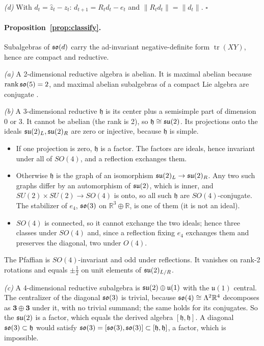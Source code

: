 \emph{(d)} With $d_t=\hat z_t-z_t$: $d_{t+1}=R_td_t-e_t$ and $\|R_td_t\|=\|d_t\|$.
$\square$

\paragraph{Proposition~\ref{prop:classify}.}
Subalgebras of $\mathfrak{so}(d)$ carry the ad-invariant negative-definite form $\operatorname{tr}(XY)$, hence are compact and
reductive.

\emph{(a)} A 2-dimensional reductive algebra is abelian. It is maximal abelian because
$\operatorname{rank}\mathfrak{so}(5)=2$, and maximal abelian subalgebras of a compact Lie algebra are conjugate
\citep{adams1969lectures}.

\emph{(b)} A 3-dimensional reductive $\mathfrak h$ is its center plus a semisimple part of dimension $0$ or $3$.
It cannot be abelian (the rank is 2), so $\mathfrak h\cong\mathfrak{su}(2)$. Its projections onto the ideals $\mathfrak{su}(2)_{L},\mathfrak{su}(2)_{R}$ are zero or injective, because
$\mathfrak h$ is simple.
\begin{itemize}
\item If one projection is zero, $\mathfrak h$ is a factor. The factors are ideals, hence invariant under all of
$SO(4)$, and a reflection exchanges them.
\item Otherwise $\mathfrak h$ is the graph of an isomorphism $\mathfrak{su}(2)_L\to\mathfrak{su}(2)_R$. Any two such graphs differ
by an automorphism of $\mathfrak{su}(2)$, which is inner, and $SU(2)\times SU(2)\to SO(4)$ is onto, so all such $\mathfrak h$
are $SO(4)$-conjugate. The stabilizer of $e_4$, $\mathfrak{so}(3)$ on $\mathbb R^3\oplus\mathbb R$, is one of them (it is not
an ideal).
\item $SO(4)$ is connected, so it cannot exchange the two ideals; hence three classes under $SO(4)$ and, since a
reflection fixing $e_4$ exchanges them and preserves the diagonal, two under $O(4)$.
\end{itemize}
The Pfaffian is $SO(4)$-invariant and odd under reflections. It vanishes on rank-2 rotations and equals
$\pm\frac12$ on unit elements of $\mathfrak{su}(2)_{L/R}$.

\emph{(c)} A 4-dimensional reductive subalgebra is $\mathfrak{su}(2)\oplus\mathfrak u(1)$ with the $\mathfrak u(1)$ central.
The centralizer of the diagonal $\mathfrak{so}(3)$ is trivial, because $\mathfrak{so}(4)\cong\Lambda^2\mathbb R^4$ decomposes as
$\mathbf 3\oplus\mathbf 3$ under it, with no trivial summand; the same holds for its conjugates. So the $\mathfrak{su}(2)$ is
a factor, which equals the derived algebra $[\mathfrak h,\mathfrak h]$. A diagonal $\mathfrak{so}(3)\subset\mathfrak h$ would
satisfy $\mathfrak{so}(3)=[\mathfrak{so}(3),\mathfrak{so}(3)]\subset[\mathfrak h,\mathfrak h]$, a factor, which is impossible.

